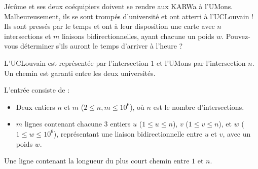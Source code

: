 \problemname{\problemyamlname}



Jérôme et ses deux coéquipiers doivent se rendre aux KARWa à l'UMons.
Malheureusement, ils se sont trompés d'université et ont atterri à l'UCLouvain !
Ils sont pressés par le temps et ont à leur disposition une carte avec $n$ intersections et $m$ liaisons bidirectionnelles, ayant chacune un poids $w$.
Pouvez-vous déterminer s'ils auront le temps d'arriver à l'heure ?

L'UCLouvain est représentée par l'intersection $1$ et l'UMons par l'intersection $n$.
Un chemin est garanti entre les deux universités.

\begin{Input}
	L'entrée consiste de :
	\begin{itemize}
		\item Deux entiers $n$ et $m$ ($2 \le n, m \le 10^6$), où $n$ est le nombre d'intersections.
		\item $m$ lignes contenant chacune 3 entiers $u$ ($1 \le u \le n$), $v$ ($1 \le v \le n$), et $w$ ($1 \le w \le 10^6$), représentant une liaison bidirectionnelle entre $u$ et $v$, avec un poids $w$.
	\end{itemize}
\end{Input}

\begin{Output}
	Une ligne contenant la longueur du plus court chemin entre $1$ et $n$.
\end{Output}
